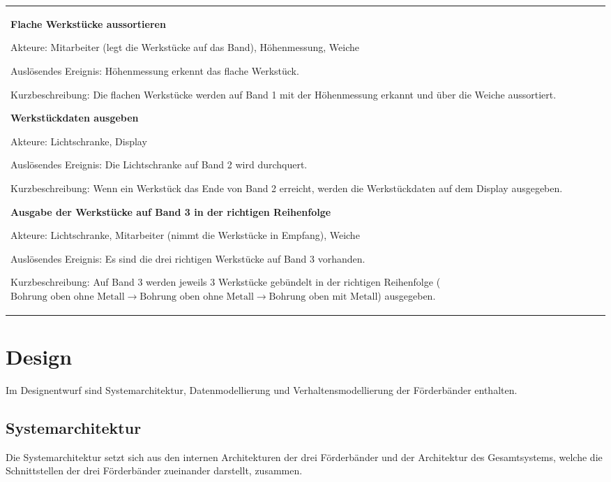 \documentclass[a4paper, 11pt]{article}
\begin{document}
\begin{table}[h]
\center
\begin{tabularx}{\textwidth}{X}

\begin{compactenum}[1.]
\item \textbf{Flache Werkstücke aussortieren}
\medskip

Akteure: Mitarbeiter (legt die Werkstücke auf das Band), Höhenmessung, Weiche
\medskip

Auslösendes Ereignis: Höhenmessung erkennt das flache Werkstück.
\medskip

Kurzbeschreibung: Die flachen Werkstücke werden auf Band 1 mit der Höhenmessung erkannt und über die Weiche aussortiert.
\bigskip

\item \textbf{Werkstückdaten ausgeben}
\medskip

Akteure: Lichtschranke, Display
\medskip

Auslösendes Ereignis: Die Lichtschranke auf Band 2 wird durchquert.
\medskip

Kurzbeschreibung: Wenn ein Werkstück das Ende von Band 2 erreicht, werden die Werkstückdaten auf dem Display ausgegeben.
\bigskip

\item \textbf{Ausgabe der Werkstücke auf Band 3 in der richtigen Reihenfolge}
\medskip

Akteure: Lichtschranke, Mitarbeiter (nimmt die Werkstücke in Empfang), Weiche
\medskip

Auslösendes Ereignis: Es sind die drei richtigen Werkstücke auf Band 3 vorhanden.
\medskip

Kurzbeschreibung: Auf Band 3 werden jeweils 3 Werkstücke gebündelt in der richtigen Reihenfolge ($\text{Bohrung oben ohne Metall}\rightarrow \text{Bohrung oben ohne Metall}\rightarrow \text{Bohrung oben mit Metall}$) ausgegeben.
\end{compactenum}
\end{tabularx}
\label{ucs}
\end{table}

\newpage

\section{Design}
Im Designentwurf sind Systemarchitektur, Datenmodellierung und Verhaltensmodellierung der Förderbänder enthalten.

\subsection{Systemarchitektur}
Die Systemarchitektur setzt sich aus den internen Architekturen der drei Förderbänder und der Architektur des Gesamtsystems, welche die Schnittstellen der drei Förderbänder zueinander darstellt, zusammen.
\end{document}
